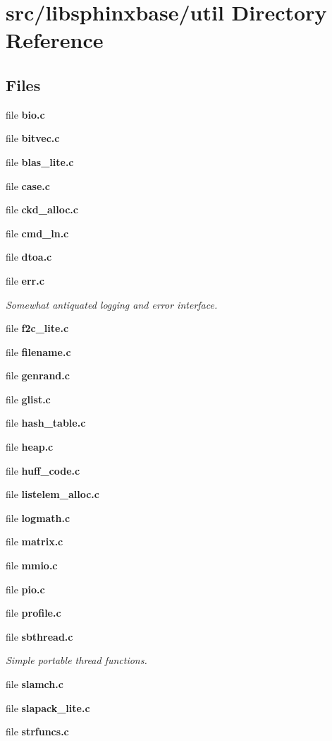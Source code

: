 \section{src/libsphinxbase/util Directory Reference}
\label{dir_dc1f04dceb148346198172cb52290701}
\subsection*{Files}
\begin{DoxyCompactItemize}
\item 
file {\bfseries bio.\+c}
\item 
file {\bfseries bitvec.\+c}
\item 
file {\bfseries blas\+\_\+lite.\+c}
\item 
file {\bfseries case.\+c}
\item 
file {\bfseries ckd\+\_\+alloc.\+c}
\item 
file {\bfseries cmd\+\_\+ln.\+c}
\item 
file {\bfseries dtoa.\+c}
\item 
file {\bf err.\+c}
\begin{DoxyCompactList}\small\item\em Somewhat antiquated logging and error interface. \end{DoxyCompactList}\item 
file {\bfseries f2c\+\_\+lite.\+c}
\item 
file {\bfseries filename.\+c}
\item 
file {\bfseries genrand.\+c}
\item 
file {\bfseries glist.\+c}
\item 
file {\bfseries hash\+\_\+table.\+c}
\item 
file {\bfseries heap.\+c}
\item 
file {\bfseries huff\+\_\+code.\+c}
\item 
file {\bfseries listelem\+\_\+alloc.\+c}
\item 
file {\bfseries logmath.\+c}
\item 
file {\bfseries matrix.\+c}
\item 
file {\bfseries mmio.\+c}
\item 
file {\bfseries pio.\+c}
\item 
file {\bfseries profile.\+c}
\item 
file {\bf sbthread.\+c}
\begin{DoxyCompactList}\small\item\em Simple portable thread functions. \end{DoxyCompactList}\item 
file {\bfseries slamch.\+c}
\item 
file {\bfseries slapack\+\_\+lite.\+c}
\item 
file {\bfseries strfuncs.\+c}
\end{DoxyCompactItemize}
